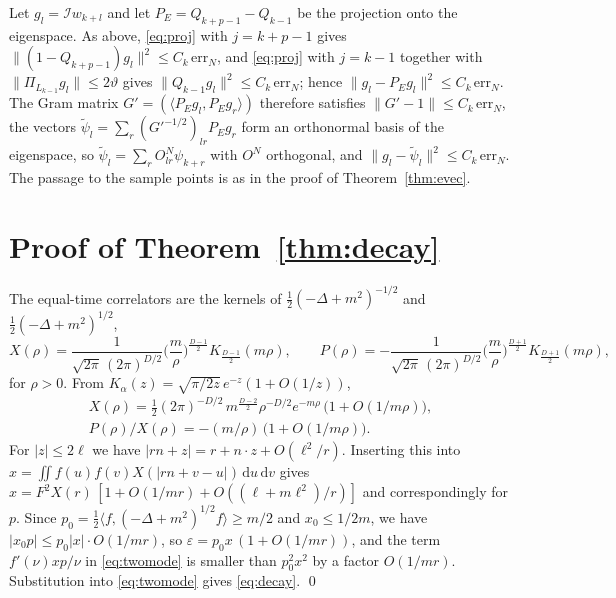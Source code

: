 \documentclass[11pt,a4paper]{article}
\makeatletter
\theoremstyle{stmt}
\theoremstyle{defn}
\theoremstyle{rmk}
\renewenvironment{proof}[1][\proofname]{\par\pushQED{\qed}\normalfont\topsep6\p@\@plus6\p@\relax
  \trivlist\item[\hskip\labelsep{\sffamily\itshape\small #1.}]\ignorespaces}{\popQED\endtrivlist\@endpefalse}
\numberwithin{equation}{section}
\newcommand{\dd}{\mathrm{d}}
\makeatother
\begin{document}
\begin{proof}[Proof of Theorem~\ref{thm:cluster}]
Let $g_l=\mathcal Iw_{k+l}$ and let $P_E=Q_{k+p-1}-Q_{k-1}$ be the projection onto the eigenspace. As above, \eqref{eq:proj} with $j=k+p-1$ gives $\|(1-Q_{k+p-1})g_l\|^2\le C_k\,\mathrm{err}_N$, and \eqref{eq:proj} with $j=k-1$ together with $\|\Pi_{L_{k-1}}g_l\|\le2\vartheta$ gives $\|Q_{k-1}g_l\|^2\le C_k\,\mathrm{err}_N$; hence $\|g_l-P_Eg_l\|^2\le C_k\,\mathrm{err}_N$. The Gram matrix $G'=(\langle P_Eg_l,P_Eg_r\rangle)$ therefore satisfies $\|G'-1\|\le C_k\,\mathrm{err}_N$, the vectors $\tilde\psi_l=\sum_r(G'^{-1/2})_{lr}P_Eg_r$ form an orthonormal basis of the eigenspace, so $\tilde\psi_l=\sum_rO^N_{lr}\psi_{k+r}$ with $O^N$ orthogonal, and $\|g_l-\tilde\psi_l\|^2\le C_k\,\mathrm{err}_N$. The passage to the sample points is as in the proof of Theorem~\ref{thm:evec}.
\end{proof}


\section{Proof of Theorem~\ref{thm:decay}}\label{app:decay}

The equal-time correlators are the kernels of $\tfrac12(-\Delta+m^2)^{-1/2}$ and $\tfrac12(-\Delta+m^2)^{1/2}$,
\begin{equation}
X(\rho)=\frac{1}{\sqrt{2\pi}\,(2\pi)^{D/2}}\Big(\frac m\rho\Big)^{\frac{D-1}{2}}K_{\frac{D-1}{2}}(m\rho),\qquad
P(\rho)=-\frac{1}{\sqrt{2\pi}\,(2\pi)^{D/2}}\Big(\frac m\rho\Big)^{\frac{D+1}{2}}K_{\frac{D+1}{2}}(m\rho),
\end{equation}
for $\rho>0$. From $K_\alpha(z)=\sqrt{\pi/2z}\,e^{-z}(1+O(1/z))$,
\begin{equation}\label{eq:XPasym}
\begin{gathered}
X(\rho)=\tfrac12(2\pi)^{-D/2}\,m^{\frac{D-2}{2}}\rho^{-D/2}e^{-m\rho}\,\big(1+O(1/m\rho)\big),\\
P(\rho)/X(\rho)=-(m/\rho)\,\big(1+O(1/m\rho)\big).
\end{gathered}
\end{equation}
For $|z|\le2\ell$ we have $|rn+z|=r+n\cdot z+O(\ell^2/r)$. Inserting this into $x=\iint f(u)f(v)X(|rn+v-u|)\,\dd u\,\dd v$ gives $x=F^2X(r)\,[1+O(1/mr)+O((\ell+m\ell^2)/r)]$ and correspondingly for $p$. Since $p_0=\tfrac12\langle f,(-\Delta+m^2)^{1/2}f\rangle\ge m/2$ and $x_0\le1/2m$, we have $|x_0p|\le p_0|x|\cdot O(1/mr)$, so $\varepsilon=p_0x\,(1+O(1/mr))$, and the term $f'(\nu)xp/\nu$ in \eqref{eq:twomode} is smaller than $p_0^2x^2$ by a factor $O(1/mr)$. Substitution into \eqref{eq:twomode} gives \eqref{eq:decay}. \qed
\end{document}
